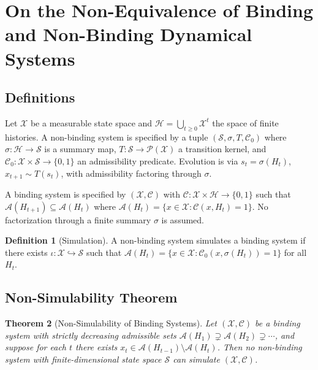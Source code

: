 \documentclass[12pt, a4paper]{article}
\theoremstyle{plain}
\newtheorem{theorem}{Theorem}[section]
\theoremstyle{definition}
\newtheorem{definition}[theorem]{Definition}
\theoremstyle{remark}
\begin{document}
\section{On the Non-Equivalence of Binding and Non-Binding Dynamical Systems}

\subsection{Definitions}

Let $\mathcal{X}$ be a measurable state space and $\mathcal{H} = \bigcup_{t \ge 0} \mathcal{X}^t$ the space of finite histories. A non-binding system is specified by a tuple $(\mathcal{S}, \sigma, T, \mathcal{C}_0)$ where $\sigma : \mathcal{H} \to \mathcal{S}$ is a summary map, $T : \mathcal{S} \to \mathcal{P}(\mathcal{X})$ a transition kernel, and $\mathcal{C}_0 : \mathcal{X} \times \mathcal{S} \to \{0,1\}$ an admissibility predicate. Evolution is via $s_t = \sigma(H_t)$, $x_{t+1} \sim T(s_t)$, with admissibility factoring through $\sigma$.

A binding system is specified by $(\mathcal{X}, \mathcal{C})$ with $\mathcal{C} : \mathcal{X} \times \mathcal{H} \to \{0,1\}$ such that $\mathcal{A}(H_{t+1}) \subseteq \mathcal{A}(H_t)$ where $\mathcal{A}(H_t) = \{x \in \mathcal{X} : \mathcal{C}(x, H_t) = 1\}$. No factorization through a finite summary $\sigma$ is assumed.

\begin{definition}[Simulation]
A non-binding system simulates a binding system if there exists $\iota : \mathcal{X} \hookrightarrow \mathcal{S}$ such that $\mathcal{A}(H_t) = \{x \in \mathcal{X} : \mathcal{C}_0(x, \sigma(H_t)) = 1\}$ for all $H_t$.
\end{definition}

\subsection{Non-Simulability Theorem}

\begin{theorem}[Non-Simulability of Binding Systems]
Let $(\mathcal{X}, \mathcal{C})$ be a binding system with strictly decreasing admissible sets $\mathcal{A}(H_1) \supsetneq \mathcal{A}(H_2) \supsetneq \cdots$, and suppose for each $t$ there exists $x_t \in \mathcal{A}(H_{t-1}) \setminus \mathcal{A}(H_t)$. Then no non-binding system with finite-dimensional state space $\mathcal{S}$ can simulate $(\mathcal{X}, \mathcal{C})$.
\end{theorem}
\end{document}
